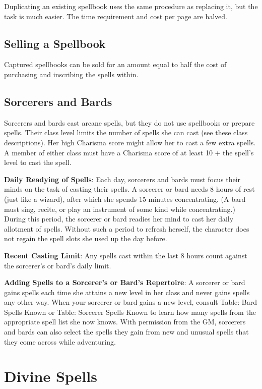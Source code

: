 Duplicating an existing spellbook uses the same procedure as replacing it, but the task is much easier. The time requirement and cost per page are halved.
				
\subsection{Selling a Spellbook}

				
Captured spellbooks can be sold for an amount equal to half the cost of purchasing and inscribing the spells within.
				
\subsection{Sorcerers and Bards}

				
Sorcerers and bards cast arcane spells, but they do not use spellbooks or prepare spells. Their class level limits the number of spells she can cast (see these class descriptions). Her high Charisma score might allow her to cast a few extra spells. A member of either class must have a Charisma score of at least 10 + the spell's level to cast the spell.
				
\textbf{Daily Readying of Spells}: Each day, sorcerers and bards must focus their minds on the task of casting their spells. A sorcerer or bard needs 8 hours of rest (just like a wizard), after which she spends 15 minutes concentrating. (A bard must sing, recite, or play an instrument of some kind while concentrating.) During this period, the sorcerer or bard readies her mind to cast her daily allotment of spells. Without such a period to refresh herself, the character does not regain the spell slots she used up the day before.
				
\textbf{Recent Casting Limit}: Any spells cast within the last 8 hours count against the sorcerer's or bard's daily limit.
				
\textbf{Adding Spells to a Sorcerer's or Bard's Repertoire}: A sorcerer or bard gains spells each time she attains a new level in her class and never gains spells any other way. When your sorcerer or bard gains a new level, consult Table: Bard Spells Known or Table: Sorcerer Spells Known to learn how many spells from the appropriate spell list she now knows. With permission from the GM, sorcerers and bards can also select the spells they gain from new and unusual spells that they come across while adventuring.
				
\section{Divine Spells}

